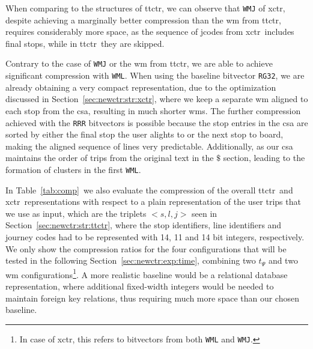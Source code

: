     When comparing to the structures of \gls{ttctr}, we can observe that \texttt{WMJ} of \gls{xctr}, despite achieving a marginally better compression than the \gls{wm} from \gls{ttctr}, requires considerably more space, as the sequence of jcodes from \gls{xctr}~includes final stops, while in \gls{ttctr}~they are skipped.
    
    Contrary to the case of \texttt{WMJ} or the \gls{wm} from \gls{ttctr}, we are able to achieve significant compression with \texttt{WML}. When using the baseline bitvector \texttt{RG32}, we are already obtaining a very compact representation, due to the optimization discussed in Section~\ref{sec:newctr:str:xctr}, where we keep a separate \gls{wm} aligned to each stop from the \gls{csa}, resulting in much shorter \gls{wm}s. The further compression achieved with the \texttt{RRR} bitvectors is possible because the stop entries in the \gls{csa} are sorted by either the final stop the user alights to or the next stop to board, making the aligned sequence of lines very predictable. Additionally, as our \gls{csa} maintains the order of trips from the original text in the $\$$ section, leading to the formation of clusters in the first \texttt{WML}.
    
    In Table~\ref{tab:comp}~we also evaluate the compression of the overall \gls{ttctr}~and \gls{xctr}~representations with respect to a plain representation of the user trips that we use as input, which are the triplets $<s,l,j>$ seen in Section~\ref{sec:newctr:str:ttctr}, where the stop identifiers, line identifiers and journey codes had to be represented with 14, 11 and 14 bit integers, respectively. We only show the compression ratios for the four configurations that will be tested in the following Section~\ref{sec:newctr:exp:time}, combining two $t_{\Psi}$ and two \gls{wm} configurations\footnote{In case of \gls{xctr}, this refers to bitvectors from both \texttt{WML} and \texttt{WMJ}.}. A more realistic baseline would be a relational database representation, where additional fixed-width integers would be needed to maintain foreign key relations, thus requiring much more space than our chosen baseline.
    

